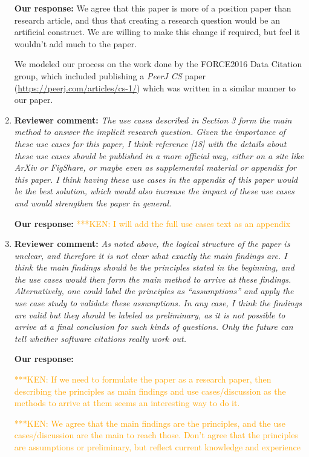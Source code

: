 \documentclass{article}
\newcommand{\niemnote}[1]{ {\textcolor{orange} { ***KEN: #1 }}} %
\begin{document}
\begin{enumerate}
\textbf{Our response:}
We agree that this paper is more of a position paper than research article, and thus that creating a research question would be an artificial construct. We are willing to make this change if required, but feel it wouldn't add much to the paper.

We modeled our process on the work done by the FORCE2016 Data Citation group, which included publishing a \emph{PeerJ CS} paper (\url{https://peerj.com/articles/cs-1/}) which was written in a similar manner to our paper.

\item \textbf{Reviewer comment:}
\emph{The use cases described in Section 3 form the main method to answer the implicit research question. Given the importance of these use cases for this paper, I think reference [18] with the details about these use cases should be published in a more official way, either on a site like ArXiv or FigShare, or maybe even as supplemental material or appendix for this paper. I think having these use cases in the appendix of this paper would be the best solution, which would also increase the impact of these use cases and would strengthen the paper in general.}

\textbf{Our response:}
\niemnote{I will add the full use cases text as an appendix}


\item \textbf{Reviewer comment:}
\emph{As noted above, the logical structure of the paper is unclear, and therefore it is not clear what exactly the main findings are. I think the main findings should be the principles stated in the beginning, and the use cases would then form the main method to arrive at these findings. Alternatively, one could label the principles as ``assumptions'' and apply the use case study to validate these assumptions. In any case, I think the findings are valid but they should be labeled as preliminary, as it is not possible to arrive at a final conclusion for such kinds of questions. Only the future can tell whether software citations really work out.}

\textbf{Our response:}

\niemnote{If we need to formulate the paper as a research paper, then describing the principles as main findings and use cases\slash discussion as the methods to arrive at them seems an interesting way to do it.}

\niemnote{We agree that the main findings are the principles, and the use cases/discussion are the main to reach those.  Don't agree that the principles are assumptions or preliminary, but reflect current knowledge and experience}


\end{enumerate}
\end{document}

